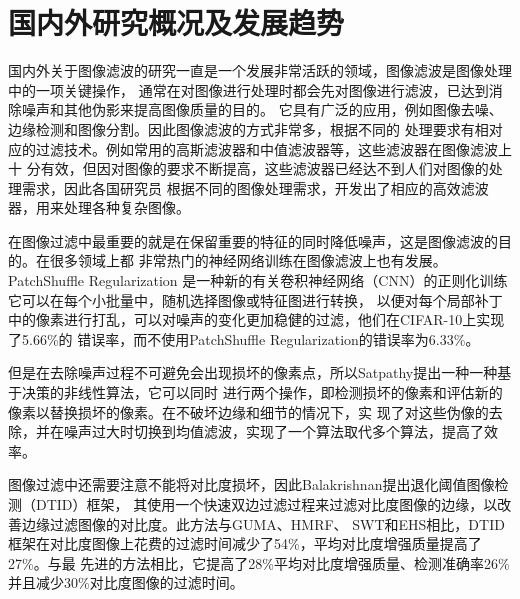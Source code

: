 %
%
%
%

\section{国内外研究概况及发展趋势}
国内外关于图像滤波的研究一直是一个发展非常活跃的领域，图像滤波是图像处理中的一项关键操作，
通常在对图像进行处理时都会先对图像进行滤波，已达到消除噪声和其他伪影来提高图像质量的目的。
它具有广泛的应用，例如图像去噪、边缘检测和图像分割。因此图像滤波的方式非常多，根据不同的
处理要求有相对应的过滤技术。例如常用的高斯滤波器和中值滤波器等，这些滤波器在图像滤波上十
分有效，但因对图像的要求不断提高，这些滤波器已经达不到人们对图像的处理需求，因此各国研究员
根据不同的图像处理需求，开发出了相应的高效滤波器，用来处理各种复杂图像。

在图像过滤中最重要的就是在保留重要的特征的同时降低噪声，这是图像滤波的目的。在很多领域上都
非常热门的神经网络训练在图像滤波上也有发展。PatchShuffle Regularization\cite{kangPatchShuffleRegularization2017}
是一种新的有关卷积神经网络（CNN）的正则化训练它可以在每个小批量中，随机选择图像或特征图进行转换，
以便对每个局部补丁中的像素进行打乱，可以对噪声的变化更加稳健的过滤，他们在CIFAR-10上实现了5.66\%的
错误率，而不使用PatchShuffle Regularization的错误率为6.33\%。

但是在去除噪声过程不可避免会出现损坏的像素点，所以Satpathy\cite{satpathyAdaptiveNonlinearFiltering2022}提出一种一种基于决策的非线性算法，它可以同时
进行两个操作，即检测损坏的像素和评估新的像素以替换损坏的像素。在不破坏边缘和细节的情况下，实
现了对这些伪像的去除，并在噪声过大时切换到均值滤波，实现了一个算法取代多个算法，提高了效率。

图像过滤中还需要注意不能将对比度损坏，因此Balakrishnan\cite{natarajanContrastEnhancementBased2022}提出退化阈值图像检测（DTID）框架，
其使用一个快速双边过滤过程来过滤对比度图像的边缘，以改善边缘过滤图像的对比度。此方法与GUMA、HMRF、
SWT和EHS相比，DTID框架在对比度图像上花费的过滤时间减少了54\%，平均对比度增强质量提高了27\%。与最
先进的方法相比，它提高了28\%平均对比度增强质量、检测准确率26\%并且减少30\%对比度图像的过滤时间。


